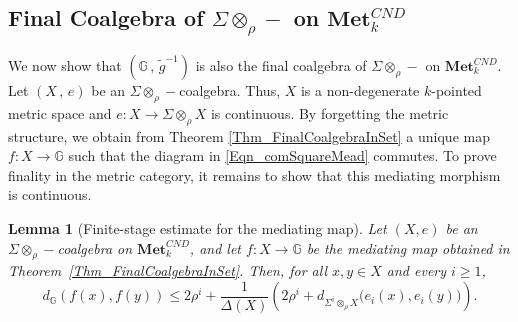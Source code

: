 \documentclass{sn-jnl}%
\theoremstyle{thmstyleone}%
\newtheorem{lemma}[theorem]{Lemma}%
\theoremstyle{thmstyletwo}%
\theoremstyle{thmstylethree}%
\newcommand{\mcnd}{\mathbf{Met}_{k}^{CND}}
\newcommand{\M}{\Sigma}
\newcommand{\Fw}{\M\otimes_{\w}}
\newcommand{\Fwi}[1]{\M^{#1}\otimes_{\w}}
\newcommand{\G}{\mathbb{G}}
\newcommand{\g}{\tilde{g}^{-1}}
\newcommand{\w}{\rho}
\begin{document}
\subsection{Final Coalgebra of $\Fw-$ on $\mcnd$}
\label{Sec:FinalCoalgebraMetric}
We now show that $(\G\,,\,\g)$ is also the final coalgebra of $\Fw-$ on $\mcnd$. Let $(X\,,\,e)$ be an $\Fw-$coalgebra. Thus, $X$ is a non-degenerate $k$-pointed metric space and $e:X\rightarrow \Fw X$ is continuous. By forgetting the metric structure, we obtain from Theorem \ref{Thm_FinalCoalgebraInSet} a unique map $f:X\rightarrow \G$ such that the diagram in \eqref{Eqn_comSquareMead} commutes.  To prove finality in the metric category, it remains to show that this mediating morphism is continuous.

\begin{lemma}[Finite-stage estimate for the mediating map]
\label{Lem_MediatingMapEstimate}
    Let $(X,e)$ be an $\Fw-$coalgebra on $\mcnd$, and let $f:X\rightarrow\G$ be the mediating map obtained in Theorem~\ref{Thm_FinalCoalgebraInSet}.  Then, for all $x,y\in X$ and every $i\geq1$,
    \begin{equation}
    \label{Eqn_MediatingMapEstimate}
        d_\G(f(x),f(y)) \leq 2\w^i + \frac{1}{\Delta(X)} \left(2\w^i + d_{\Fwi{i} X}\bigl(e_i(x),e_i(y)\bigr) \right).
    \end{equation}
\end{lemma}
\end{document}

